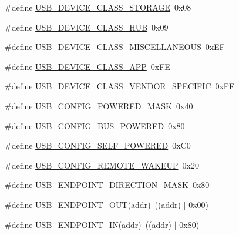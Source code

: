 \begin{DoxyCompactItemize}
\#define \hyperlink{group___u_s_b_d___core_ga053d2a9c3c9856ee01589ebb64d2e09b}{U\+S\+B\+\_\+\+D\+E\+V\+I\+C\+E\+\_\+\+C\+L\+A\+S\+S\+\_\+\+S\+T\+O\+R\+A\+GE}~0x08
\item 
\#define \hyperlink{group___u_s_b_d___core_gab8167347cb586d3f82a7ad95fa25bc22}{U\+S\+B\+\_\+\+D\+E\+V\+I\+C\+E\+\_\+\+C\+L\+A\+S\+S\+\_\+\+H\+UB}~0x09
\item 
\#define \hyperlink{group___u_s_b_d___core_gabd79da65d7f8f58b37e402fa1442831a}{U\+S\+B\+\_\+\+D\+E\+V\+I\+C\+E\+\_\+\+C\+L\+A\+S\+S\+\_\+\+M\+I\+S\+C\+E\+L\+L\+A\+N\+E\+O\+US}~0x\+EF
\item 
\#define \hyperlink{group___u_s_b_d___core_ga9b5f0021003a2fc948daf8d0f4768736}{U\+S\+B\+\_\+\+D\+E\+V\+I\+C\+E\+\_\+\+C\+L\+A\+S\+S\+\_\+\+A\+PP}~0x\+FE
\item 
\#define \hyperlink{group___u_s_b_d___core_ga89b94b8bc3c5fa2ef7151b5d282f22bb}{U\+S\+B\+\_\+\+D\+E\+V\+I\+C\+E\+\_\+\+C\+L\+A\+S\+S\+\_\+\+V\+E\+N\+D\+O\+R\+\_\+\+S\+P\+E\+C\+I\+F\+IC}~0x\+FF
\end{DoxyCompactItemize}
\begin{DoxyCompactItemize}
\item 
\#define \hyperlink{group___u_s_b_d___core_gafdd4f846b5497985c182a1a090d99729}{U\+S\+B\+\_\+\+C\+O\+N\+F\+I\+G\+\_\+\+P\+O\+W\+E\+R\+E\+D\+\_\+\+M\+A\+SK}~0x40
\item 
\#define \hyperlink{group___u_s_b_d___core_ga63c0a08ce70650c3c677ab523a45a0bb}{U\+S\+B\+\_\+\+C\+O\+N\+F\+I\+G\+\_\+\+B\+U\+S\+\_\+\+P\+O\+W\+E\+R\+ED}~0x80
\item 
\#define \hyperlink{group___u_s_b_d___core_ga8c322771b797c09e3066a388b46e9ef9}{U\+S\+B\+\_\+\+C\+O\+N\+F\+I\+G\+\_\+\+S\+E\+L\+F\+\_\+\+P\+O\+W\+E\+R\+ED}~0x\+C0
\item 
\#define \hyperlink{group___u_s_b_d___core_ga7b28a766a8a916fae421d52fbedd2cba}{U\+S\+B\+\_\+\+C\+O\+N\+F\+I\+G\+\_\+\+R\+E\+M\+O\+T\+E\+\_\+\+W\+A\+K\+E\+UP}~0x20
\end{DoxyCompactItemize}
\begin{DoxyCompactItemize}
\item 
\#define \hyperlink{group___u_s_b_d___core_gab7544c5b8cf975839422c1ce29d4c5cb}{U\+S\+B\+\_\+\+E\+N\+D\+P\+O\+I\+N\+T\+\_\+\+D\+I\+R\+E\+C\+T\+I\+O\+N\+\_\+\+M\+A\+SK}~0x80
\item 
\#define \hyperlink{group___u_s_b_d___core_ga81ac2a8c9688d35940a054c4194c278d}{U\+S\+B\+\_\+\+E\+N\+D\+P\+O\+I\+N\+T\+\_\+\+O\+UT}(addr)~((addr) $\vert$ 0x00)
\item 
\#define \hyperlink{group___u_s_b_d___core_gabe258bf57244c49874da6d53679e6df8}{U\+S\+B\+\_\+\+E\+N\+D\+P\+O\+I\+N\+T\+\_\+\+IN}(addr)~((addr) $\vert$ 0x80)
\end{DoxyCompactItemize}
